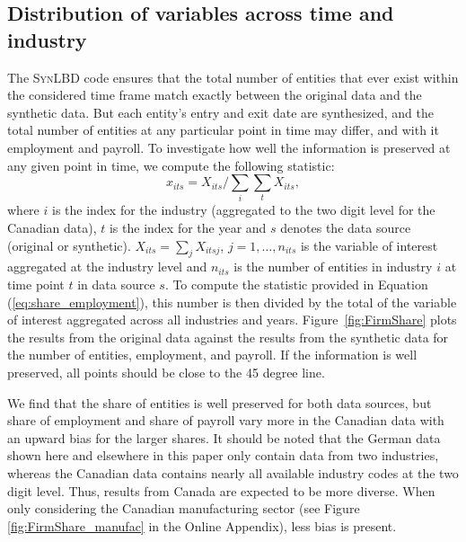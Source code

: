 \documentclass[10pt,twoside]{article}
\newcommand{\SynLBD}{\textsc{SynLBD}}
\begin{document}
\subsection{Distribution of variables across time and industry}



The \SynLBD{} code  ensures that the total number of entities that ever exist within the considered time frame  match exactly between the original data and the synthetic data. But  each entity's entry and exit date are synthesized, and the total number of entities at any particular point in time may differ, and with it employment and payroll. To investigate how well the information is preserved at any given point in time, we compute the following statistic:
\begin{equation}
    \label{eq:share_employment}
x_{its} = X_{its}/\sum_{i} \sum_{t} X_{its}, 
\end{equation}
where $i$ is the index for the industry (aggregated to the two digit level for the Canadian data), $t$ is the index for the year and $s$ denotes the data source (original or synthetic). $X_{its}=\sum_j X_{itsj}$, $j=1,\ldots,n_{its}$ is the variable of interest aggregated at the industry level and $n_{its}$ is the number of entities in industry $i$ at time point $t$ in data source $s$. 
To compute the statistic provided in Equation (\ref{eq:share_employment}), this number is then divided by the total of the variable of interest aggregated across all industries and years.
Figure~\ref{fig:FirmShare} plots the results from the original data against the results from the synthetic data for the  number of entities, employment, and {payroll}. If the information is well preserved, all points should be close to the 45 degree line. 



We find that the share of entities is well preserved for both data sources, but share of employment and share of payroll vary more in the Canadian data with an upward bias for the larger shares. 
It should be noted that the German data shown here and elsewhere in this paper only contain data from two industries, whereas the Canadian data contains nearly all  available industry codes at the two digit level. Thus, results from Canada are expected to be more diverse. 
When only considering the Canadian manufacturing sector (see Figure \ref{fig:FirmShare_manufac} in the Online Appendix), less bias is present.
\end{document}
